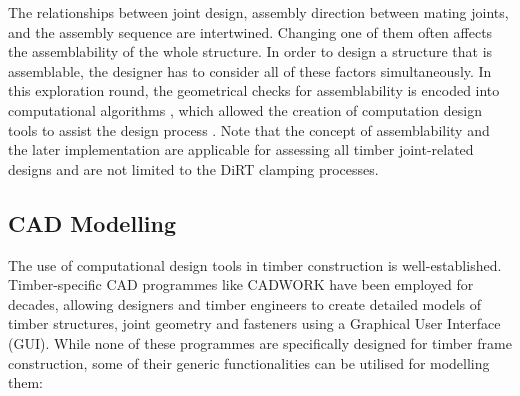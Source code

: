 The relationships between joint design, assembly direction between mating joints, and the assembly sequence are intertwined. Changing one of them often affects the assemblability of the whole structure. In order to design a structure that is assemblable, the designer has to consider all of these factors simultaneously. In this exploration round, the geometrical checks for assemblability is encoded into computational algorithms , which allowed the creation of computation design tools to assist the design process . Note that the concept of assemblability and the later implementation are applicable for assessing all timber joint-related designs and are not limited to the DiRT clamping processes.

\subsection{CAD Modelling}
\label{subsection:exploration-2-cad-modelling}

The use of computational design tools in timber construction is well-established.
Timber-specific CAD programmes like CADWORK have been employed for decades, allowing designers and timber engineers to create detailed models of timber structures, joint geometry and fasteners using a Graphical User Interface (GUI). 
While none of these programmes are specifically designed for timber frame construction, some of their generic functionalities can be utilised for modelling them:

